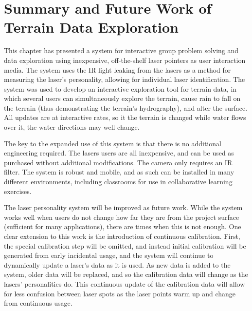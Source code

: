 \section{Summary and Future Work of Terrain Data Exploration}
\label{section:SummaryAndFutureWorkDataExploration}

This chapter has presented a system for interactive group problem solving and data exploration using inexpensive, off-the-shelf laser pointers as user interaction media. The system uses the IR light leaking from the lasers as a method for measuring the laser's personality,
allowing for individual laser identification. The system was used to develop an interactive exploration tool for terrain data, in which several users can simultaneously explore the terrain, cause rain to fall on the terrain (thus demonstrating the terrain's hydrography), and alter the surface. All updates are at interactive rates, so it the terrain is changed while water flows over it, the water directions may well change. 

The key to the expanded use of this system is that there is no additional engineering required. The lasers users are all inexpensive, and can be used as purchased without additional modifications. 
The camera 
only requires an IR filter. 
The system is robust and mobile, and as such can be installed in many different environments, including classrooms for use in collaborative learning exercises. 




The laser personality system will be improved as future work.
While the system works well when users do not change how far they are from the project surface (sufficient for many applications), there are times when this is not enough. One clear extension to this work is the introduction of continuous calibration. First, the special calibration step will be omitted, and instead initial calibration will be generated from early incidental usage, and the system will continue to dynamically update a laser's data as it is used. As new data is added to the system, older data will be replaced, and so the calibration data will change as the lasers' personalities do. This continuous update of the calibration data will allow for less confusion between laser spots as the laser points warm up and change from continuous usage. 

